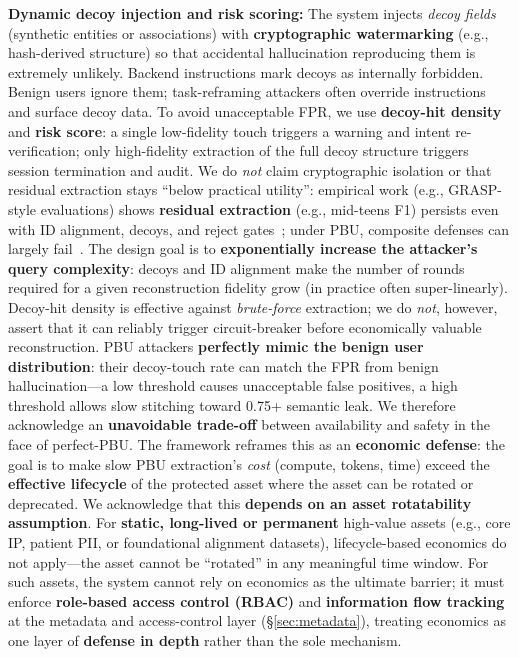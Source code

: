 \documentclass[letterpaper,twocolumn,10pt]{article}
\begin{document}
\textbf{Dynamic decoy injection and risk scoring:} The system injects \emph{decoy fields} (synthetic entities or associations) with \textbf{cryptographic watermarking} (e.g., hash-derived structure) so that accidental hallucination reproducing them is extremely unlikely. Backend instructions mark decoys as internally forbidden. Benign users ignore them; task-reframing attackers often override instructions and surface decoy data. To avoid unacceptable FPR, we use \textbf{decoy-hit density} and \textbf{risk score}: a single low-fidelity touch triggers a warning and intent re-verification; only high-fidelity extraction of the full decoy structure triggers session termination and audit. We do \emph{not} claim cryptographic isolation or that residual extraction stays ``below practical utility'': empirical work (e.g., GRASP-style evaluations) shows \textbf{residual extraction} (e.g., mid-teens F1) persists even with ID alignment, decoys, and reject gates~\cite{subgraph-rag-attack}; under PBU, composite defenses can largely fail~\cite{pbu-reconstruct}. The design goal is to \textbf{exponentially increase the attacker's query complexity}: decoys and ID alignment make the number of rounds required for a given reconstruction fidelity grow (in practice often super-linearly). Decoy-hit density is effective against \emph{brute-force} extraction; we do \emph{not}, however, assert that it can reliably trigger circuit-breaker before economically valuable reconstruction. PBU attackers \textbf{perfectly mimic the benign user distribution}: their decoy-touch rate can match the FPR from benign hallucination---a low threshold causes unacceptable false positives, a high threshold allows slow stitching toward 0.75+ semantic leak. We therefore acknowledge an \textbf{unavoidable trade-off} between availability and safety in the face of perfect-PBU. The framework reframes this as an \textbf{economic defense}: the goal is to make slow PBU extraction's \emph{cost} (compute, tokens, time) exceed the \textbf{effective lifecycle} of the protected asset where the asset can be rotated or deprecated. We acknowledge that this \textbf{depends on an asset rotatability assumption}. For \textbf{static, long-lived or permanent} high-value assets (e.g., core IP, patient PII, or foundational alignment datasets), lifecycle-based economics do not apply---the asset cannot be ``rotated'' in any meaningful time window. For such assets, the system cannot rely on economics as the ultimate barrier; it must enforce \textbf{role-based access control (RBAC)} and \textbf{information flow tracking} at the metadata and access-control layer (\S\ref{sec:metadata}), treating economics as one layer of \textbf{defense in depth} rather than the sole mechanism.
\end{document}

